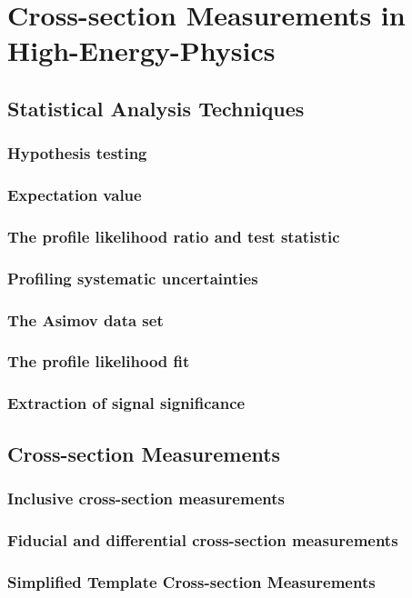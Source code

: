 \chapter{Cross-section Measurements in High-Energy-Physics}
\label{chap:statistics}

\section{Statistical Analysis Techniques}
\subsection{Hypothesis testing}
\subsection{Expectation value}
\subsection{The profile likelihood ratio and test statistic}
\subsection{Profiling systematic uncertainties}
\subsection{The Asimov data set}
\subsection{The profile likelihood fit}
\subsection{Extraction of signal significance}

\section{Cross-section Measurements}
\subsection{Inclusive cross-section measurements}
\subsection{Fiducial and differential cross-section measurements}
\subsection{Simplified Template Cross-section Measurements}
